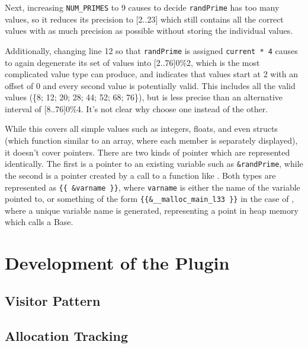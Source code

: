 Next, increasing \texttt{NUM\_PRIMES} to 9 causes  to decide \texttt{randPrime} has too many values, so it reduces its precision to [2..23] which still contains all the correct values with as much precision as possible without storing the individual values.

Additionally, changing line 12 so that \texttt{randPrime} is assigned \texttt{current * 4} causes  to again degenerate its set of values into [2..76]0\%2, which is the most complicated value type  can produce, and indicates that values start at 2 with an offset of 0 and every second value is potentially valid. This includes all the valid values (\{8; 12; 20; 28; 44; 52; 68; 76\}), but is less precise than an alternative interval of [8..76]0\%4. It's not clear why  choose one instead of the other.

While this covers all simple values such as integers, floats, and even structs (which function similar to an array, where each member is separately displayed), it doesn't cover pointers. There are two kinds of pointer which are represented identically. The first is a pointer to an existing variable such as \texttt{\&randPrime}, while the second is a pointer created by a call to a function like \malloc{}. Both types are represented as \texttt{\{\{ \&varname \}\}}, where \texttt{varname} is either the name of the variable pointed to, or something of the form \texttt{\{\{\&\_\_malloc\_main\_l33 \}\}} in the case of \malloc{}, where a unique variable name is generated, representing a point in heap memory which  calls a Base.

\section{Development of the  Plugin}

\subsection{Visitor Pattern}


\subsection{Allocation Tracking}


